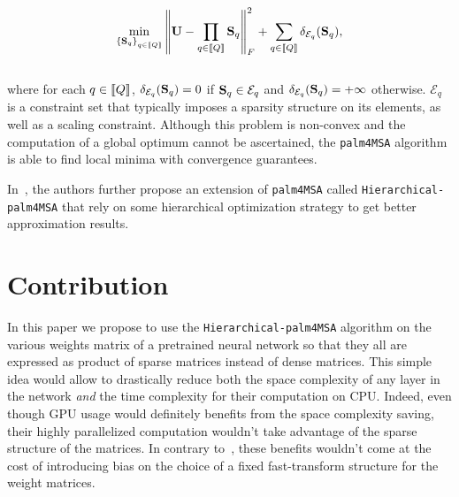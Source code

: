 \documentclass[12pt]{article}
\def\palm{\texttt{palm4MSA}\xspace}
\def\hpalm{\texttt{Hierarchical-palm4MSA}\xspace}
\newcommand{\bigO}[1]{\mathcal{O}\left(#1\right)}
\def\nfactors{Q}
\begin{document}
\begin{align}
\label{eq:palm4msa}
\min_{\left \lbrace\rmS_q\right \rbrace_{q\in\intint{Q}}} \left \|\rmU -  \prod_{q\in\intint{\nfactors}}{\rmS_q}\right \|_F^2 + \sum_{q\in\intint{\nfactors}} \delta_{\mathcal{E}_q}(\rmS_q),
\end{align}
~\\
where for each $q\in\left \llbracket Q\right \rrbracket$, $\delta_{\mathcal{E}_q}({\mathbf{S}}_q)=0$ 
if ${\mathbf{S}}_q \in \mathcal{E}_q$ and $\delta_{\mathcal{E}_q}({\mathbf{S}}_q)=+\infty$ otherwise. $\mathcal{E}_q$ is a constraint set that typically imposes a sparsity structure on its elements, as well as a scaling constraint. 
Although this problem is non-convex and the computation of a global optimum cannot be
ascertained, the \palm algorithm is able to find %
local minima with convergence guarantees. 


In~\cite{LeMagoarou2016Flexible}, the authors further propose an extension of \palm called \hpalm that rely on some hierarchical optimization strategy to get better approximation results.


\section{Contribution}

In this paper we propose to use the \hpalm algorithm on the various weights matrix of a pretrained neural network so that they all are expressed as product of sparse matrices instead of dense matrices. This simple idea would allow to drastically reduce both the space complexity of any layer in the network \textit{and} the time complexity for their computation on CPU. Indeed, even though GPU usage would definitely benefits from the space complexity saving, their highly parallelized computation wouldn't take advantage of the sparse structure of the matrices. In contrary to~\cite{yang2015deep}, these benefits wouldn't come at the cost of introducing bias on the choice of a fixed fast-transform structure for the weight matrices.
\end{document}
